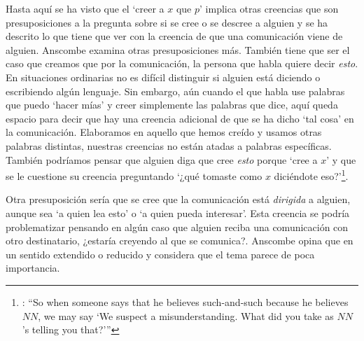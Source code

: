 Hasta aquí se ha visto que el `creer a $x$ que $p$' implica otras creencias que son presuposiciones a la pregunta sobre si se cree o se descree a alguien y se ha descrito lo que tiene que ver con la creencia de que una comunicación viene de alguien. Anscombe examina otras presuposiciones más. También tiene que ser el caso que creamos que por la comunicación, la persona que habla quiere decir \emph{esto}. En situaciones ordinarias no es difícil distinguir si alguien está diciendo o escribiendo algún lenguaje. Sin embargo, aún cuando el que habla use palabras que puedo `hacer mías' y creer simplemente las palabras que dice, aquí queda espacio para decir que hay una creencia adicional de que se ha dicho `tal cosa' en la comunicación. Elaboramos en aquello que hemos creído y usamos otras palabras distintas, nuestras creencias no están atadas a palabras específicas. También podríamos pensar que alguien diga que cree \emph{esto} porque `cree a $x$' y que se le cuestione su creencia preguntando \enquote*{¿qué tomaste como $x$ diciéndote eso?}\footnote{\cite[Cf.][8]{anscombe2008faith:tobelieve}: \enquote{So when someone says that he believes such-and-such because he believes $NN$, we may say `We suspect a misunderstanding. What did you take as $NN$'s telling you that?'}}.

Otra presuposición sería que se cree que la comunicación está \emph{dirigida} a alguien, aunque sea \enquote*{a quien lea esto} o \enquote*{a quien pueda interesar}. Esta creencia se podría problematizar pensando en algún caso que alguien reciba una comunicación con otro destinatario, ¿estaría creyendo al que se comunica?. Anscombe opina que en un sentido extendido o reducido y considera que el tema parece de poca importancia.

